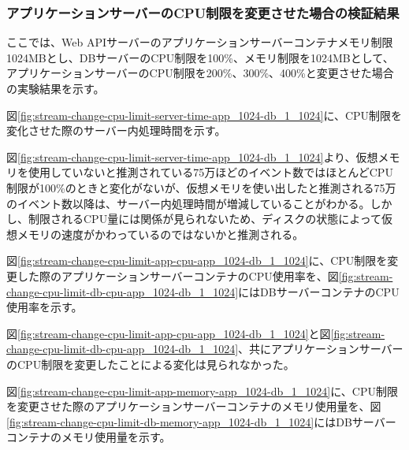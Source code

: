 \documentclass[../../../../main]{subfiles}
\begin{document}
    \subsubsection{アプリケーションサーバーのCPU制限を変更させた場合の検証結果}\label{subsubsec:result-streaming-change-app-cpu}

    ここでは、Web APIサーバーのアプリケーションサーバーコンテナメモリ制限1024MBとし、DBサーバーのCPU制限を100\%、メモリ制限を1024MBとして、アプリケーションサーバーのCPU制限を200\%、300\%、400\%と変更させた場合の実験結果を示す。


    図\ref{fig:stream-change-cpu-limit-server-time-app_1024-db_1_1024}に、CPU制限を変化させた際のサーバー内処理時間を示す。

    

    図\ref{fig:stream-change-cpu-limit-server-time-app_1024-db_1_1024}より、仮想メモリを使用していないと推測されている75万ほどのイベント数ではほとんどCPU制限が100\%のときと変化がないが、仮想メモリを使い出したと推測される75万のイベント数以降は、サーバー内処理時間が増減していることがわかる。しかし、制限されるCPU量には関係が見られないため、ディスクの状態によって仮想メモリの速度がかわっているのではないかと推測される。


    図\ref{fig:stream-change-cpu-limit-app-cpu-app_1024-db_1_1024}に、CPU制限を変更した際のアプリケーションサーバーコンテナのCPU使用率を、図\ref{fig:stream-change-cpu-limit-db-cpu-app_1024-db_1_1024}にはDBサーバーコンテナのCPU使用率を示す。

    

    

    図\ref{fig:stream-change-cpu-limit-app-cpu-app_1024-db_1_1024}と図\ref{fig:stream-change-cpu-limit-db-cpu-app_1024-db_1_1024}、共にアプリケーションサーバーのCPU制限を変更したことによる変化は見られなかった。


    図\ref{fig:stream-change-cpu-limit-app-memory-app_1024-db_1_1024}に、CPU制限を変更させた際のアプリケーションサーバーコンテナのメモリ使用量を、図\ref{fig:stream-change-cpu-limit-db-memory-app_1024-db_1_1024}にはDBサーバーコンテナのメモリ使用量を示す。

    
\end{document}

